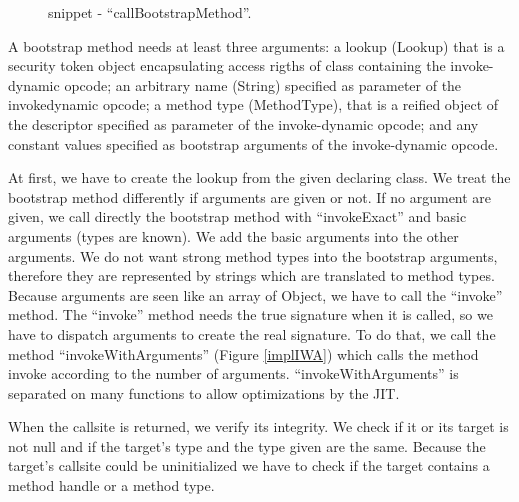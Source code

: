 \documentclass{sig-alternate}
\begin{document}
      \begin{figure}[!h]
        \centering \vspace{-1.5em}
        \caption{snippet - ``callBootstrapMethod''.}\vspace{-1em}
        \label{implBSM}
      \end{figure}

      A bootstrap method needs at least three arguments:
      a lookup (Lookup) that is a security token object encapsulating access rigths of class containing the invoke-dynamic opcode;
      an arbitrary name (String) specified as parameter of the invokedynamic opcode;
      a method type (MethodType), that is a reified object of the descriptor specified as parameter of the invoke-dynamic opcode;
      and any constant values specified as bootstrap arguments of the invoke-dynamic opcode.

      At first, we have to create the lookup from the given  declaring class.
      We treat the bootstrap method differently if arguments are given or not.
      If no argument are given, we call directly the bootstrap method
      with ``invokeExact'' and basic arguments (types are known).
      We add the basic arguments into the other arguments.
      We do not want strong method types into the bootstrap arguments,
      therefore they are represented by strings which are translated to method types.
      Because arguments are seen like an array of Object,
      we have to call the ``invoke'' method.
      The ``invoke'' method needs the true signature when it is called,
      so we have to dispatch arguments to create the real signature.
      To do that, we call the method ``invokeWithArguments'' (Figure \ref{implIWA})
      which calls the method invoke according to the number of arguments.
      ``invokeWithArguments'' is separated on many functions to allow optimizations by the JIT.


      When the callsite is returned, we verify its integrity.
      We check if it or its target is not null and if the target's type and the type given are the same.
      Because the target's callsite could be uninitialized we have to check if the target contains a method handle or a method type.
\end{document}
